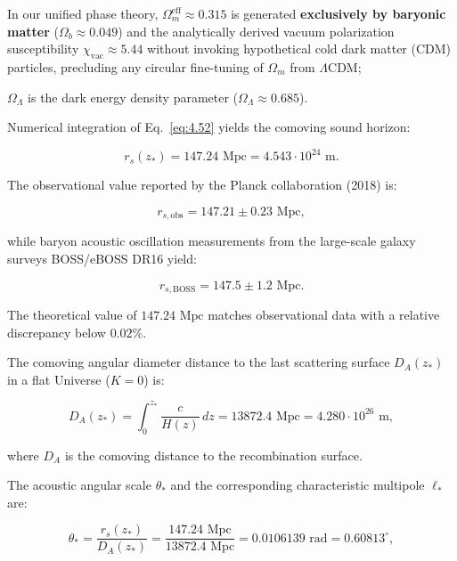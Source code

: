 In our unified phase theory, $\Omega_m^{\text{eff}} \approx 0.315$ is generated \textbf{exclusively by baryonic matter} ($\Omega_b \approx 0.049$) and the analytically derived vacuum polarization susceptibility $\chi_{\text{vac}} \approx 5.44$ without invoking hypothetical cold dark matter (CDM) particles, precluding any circular fine-tuning of $\Omega_m$ from $\Lambda\text{CDM}$;  

$\Omega_\Lambda$ is the dark energy density parameter ($\Omega_\Lambda \approx 0.685$).

Numerical integration of Eq.~\eqref{eq:4.52} yields the comoving sound horizon:

\begin{equation}\label{eq:4.55}\tag{4.55}
r_s(z_*) = 147.24\text{ Mpc} = 4.543 \cdot 10^{24}\text{ m}.
\end{equation}

The observational value reported by the Planck collaboration (2018) is:

\begin{equation}\label{eq:4.56}\tag{4.56}
r_{s, \text{obs}} = 147.21 \pm 0.23\text{ Mpc},
\end{equation}

while baryon acoustic oscillation measurements from the large-scale galaxy surveys BOSS/eBOSS DR16 \cite{ref34} yield:

\begin{equation}\label{eq:4.57}\tag{4.57}
r_{s, \text{BOSS}} = 147.5 \pm 1.2\text{ Mpc}.
\end{equation}

The theoretical value of $147.24\text{ Mpc}$ matches observational data with a relative discrepancy below $0.02\%$.

The comoving angular diameter distance to the last scattering surface $D_A(z_*)$ in a flat Universe ($K = 0$) is:

\begin{equation}\label{eq:4.58}\tag{4.58}
D_A(z_*) = \int_0^{z_*} \frac{c}{H(z)} \, dz = 13872.4\text{ Mpc} = 4.280 \cdot 10^{26}\text{ m},
\end{equation}

where $D_A$ is the comoving distance to the recombination surface.

The acoustic angular scale $\theta_*$ and the corresponding characteristic multipole $\ell_*$ are:

\begin{equation}\label{eq:4.59}\tag{4.59}
\theta_* = \frac{r_s(z_*)}{D_A(z_*)} = \frac{147.24\text{ Mpc}}{13872.4\text{ Mpc}} = 0.0106139\text{ rad} = 0.60813^\circ,
\end{equation}


